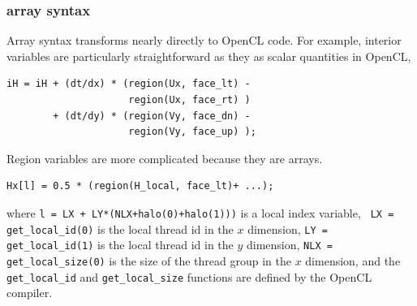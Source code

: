 \subsubsection{array syntax}

Array syntax transforms nearly directly to OpenCL code.  For example, interior
variables are particularly straightforward as they as scalar quantities in
OpenCL,

{\small
\begin{verbatim}
iH = iH + (dt/dx) * (region(Ux, face_lt) - 
                     region(Ux, face_rt) )
        + (dt/dy) * (region(Vy, face_dn) - 
                     region(Vy, face_up) );
\end{verbatim}
}

Region variables are more complicated because they are arrays.

{\small
\begin{verbatim}
Hx[l] = 0.5 * (region(H_local, face_lt)+ ...);
\end{verbatim}
}

where {\tt l = LX + LY*(NLX+halo(0)+halo(1)))} is a local index variable, {\tt
  LX = get\_local\_id(0)} is the local thread id in the $x$ dimension, {\tt LY =
  get\_local\_id(1)} is the local thread id in the $y$ dimension, {\tt NLX =
  get\_local\_size(0)} is the size of the thread group in the $x$ dimension, and
the {\tt get\_local\_id} and {\tt get\_local\_size} functions are defined by the
OpenCL compiler.
